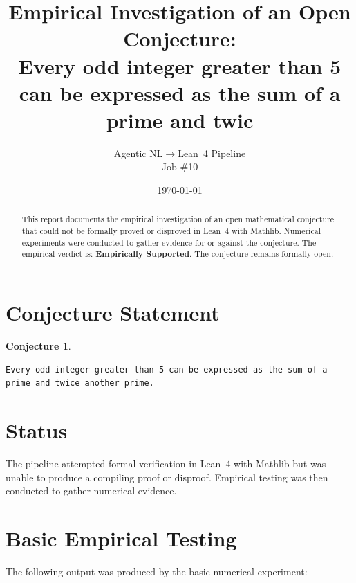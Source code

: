 \documentclass[11pt]{article}
\title{Empirical Investigation of an Open Conjecture:\\
Every odd integer greater than 5 can be expressed as the sum of a prime and twic}
\author{Agentic NL$\to$Lean~4 Pipeline \\ \small Job \#10}
\date{\today}
\newtheorem{conjecture}{Conjecture}
\begin{document}
\maketitle

\begin{abstract}
This report documents the empirical investigation of an open mathematical conjecture
that could not be formally proved or disproved in Lean~4 with Mathlib.
Numerical experiments were conducted to gather evidence for or against the conjecture.
The empirical verdict is: \textbf{\textcolor{green!70!black}{Empirically Supported}}.
The conjecture remains formally open.
\end{abstract}

\section{Conjecture Statement}

\begin{conjecture}
\begin{lstlisting}
Every odd integer greater than 5 can be expressed as the sum of a prime and twice another prime.
\end{lstlisting}
\end{conjecture}

\section{Status}

\begin{center}
\end{center}

The pipeline attempted formal verification in Lean~4 with Mathlib but was unable to
produce a compiling proof or disproof. Empirical testing was then conducted to gather
numerical evidence.

\section{Basic Empirical Testing}

The following output was produced by the basic numerical experiment:
\end{document}
